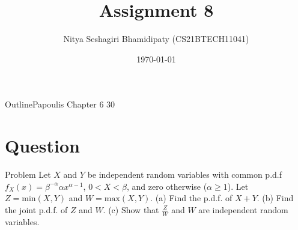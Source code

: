 \documentclass{beamer}
\title{Assignment 8}
\author{Nitya Seshagiri Bhamidipaty (CS21BTECH11041)}
\date{\today}
\begin{document}
\begin{frame}
    \titlepage 
\end{frame}
\logo{}
\begin{frame}{Outline}{Papoulis Chapter 6 30}
    \tableofcontents
\end{frame}
\section{Question}
\begin{frame}{Problem}
Let $X$ and $Y$ be independent random variables with common p.d.f $f_X(x) = \beta^{-\alpha}\alpha x^{\alpha-1}$, $0 < X < \beta$, and zero otherwise ($\alpha \ge 1$). Let $Z = \text{min}(X,Y)$ and $W=\text{max}(X,Y)$.
(a) Find the p.d.f. of $X+Y$. (b) Find the joint p.d.f. of $Z$ and $W$. (c) Show that $\frac{Z}{W}$ and $W$ are independent random variables.
\end{frame}
\end{document}

